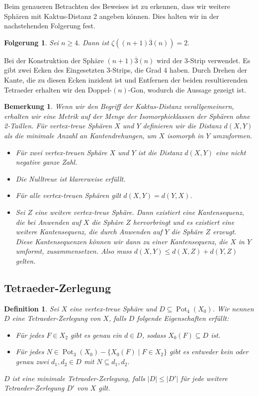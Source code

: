 \documentclass[12pt,titlepage,twoside,cleardoublepage]{article}
\theoremstyle{nummermitklammern}
\newtheorem{folgerung}[temp]{Folgerung}
\newtheorem{definition}[temp]{Definition}
\newtheorem{bemerkung}[temp]{Bemerkung}
\newtheorem{definition}[zahl]{Definition}
\newtheorem{folgerung}[zahl]{Folgerung}
\newtheorem{bemerkung}[zahl]{Bemerkung}
\numberwithin{equation}{section}
\DeclareMathOperator{\Pot}{Pot}
\begin{document}
Beim genaueren Betrachten des Beweises ist zu erkennen, dass wir weitere Sphären mit Kaktus-Distanz 2 angeben können.
Dies halten wir in der nachstehenden Folgerung fest.
\begin{folgerung}
Sei $n\geq 4.$ Dann ist $\zeta ((n+1)\overline{3}(n))=2.$
\end{folgerung}
Bei der Konstruktion der Sphäre $(n+1)\overline{3}(n)$ wird der 3-Strip verwendet. Es gibt zwei Ecken des Eingesetzten 3-Strips, die Grad 4 haben. Durch Drehen der Kante, die zu diesen Ecken inzident ist und Entfernen der beiden resultierenden Tetraeder erhalten wir den Doppel-$(n)$-Gon, wodurch die Aussage gezeigt ist.
\begin{bemerkung}
Wenn wir den Begriff der Kaktus-Distanz verallgemeinern, erhalten wir eine Metrik auf der Menge der Isomorphieklassen der Sphären ohne 2-Taillen. Für vertex-treue Sphären $X$ und $Y$ definieren wir die Distanz $d(X,Y)$ als die minimale Anzahl an Kantendrehungen, um $X$ isomorph in $Y$ umzuformen. 
\begin{itemize}
\item Für zwei vertex-treuen Sphäre $X$ und $Y$ ist die Distanz $d(X,Y)$ eine nicht negative ganze Zahl.
\item Die Nulltreue ist klarerweise erfüllt.
\item Für alle vertex-treuen Sphären gilt $d(X,Y)=d(Y,X).$
\item Sei $Z$ eine weitere vertex-treue Sphäre. Dann existiert eine Kantensequenz, die bei Anwenden auf $X$ die Sphäre $Z$ hervorbringt und es existiert eine weitere Kantensequenz, die durch Anwenden auf $Y$ die Sphäre $Z$ erzeugt. Diese Kantensequenzen können wir dann zu einer Kantensequenz, die $X$ in $Y$ umformt, zusammensetzen. Also muss $d(X,Y)\leq d(X,Z)+d(Y,Z)$ gelten.
\end{itemize}
\end{bemerkung}

\subsection{Tetraeder-Zerlegung}
\begin{definition}
Sei $X$ eine vertex-treue Sphäre und $D\subseteq \Pot_4(X_0)$. Wir nennen $D$ eine Tetraeder-Zerlegung von $X$, falls $D$ folgende Eigenschaften erfüllt:
\begin{itemize}
\item Für jedes $F\in X_2$ gibt es genau ein $d\in D$, sodass $X_0(F) \subseteq D$ ist.
\item Für jedes $N\in \Pot_3(X_0)-\{X_0(F)\mid F\in X_2\}$ gibt es entweder kein oder genau zwei $d_1,d_2\in D$ mit $N\subseteq d_1,d_2.$
\end{itemize}
$D$ ist eine minimale Tetraeder-Zerlegung, falls $\vert D \vert\leq \vert D' \vert$ für jede weitere Tetraeder-Zerlegung $D'$ von $X$ gilt.
\end{definition}
\end{document}
